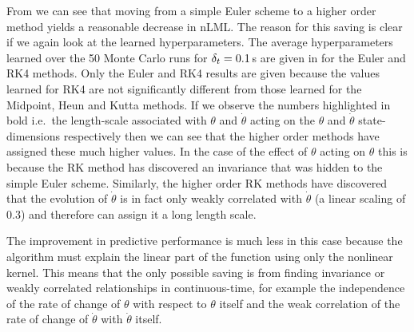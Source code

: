 From  we can see that moving from a simple Euler scheme to a higher order method yields a reasonable decrease in nLML. The reason for this saving is clear if we again look at the learned hyperparameters. The average hyperparameters learned over the 50 Monte Carlo runs for $\delta_t=0.1\,$s are given in  for the Euler and RK4 methods. Only the Euler and RK4 results are given because the values learned for RK4 are not significantly different from those learned for the Midpoint, Heun and Kutta methods. If we observe the numbers highlighted in bold i.e.\ the length-scale associated with $\theta$ and $\dot\theta$ acting on the $\theta$ and $\dot\theta$ state-dimensions respectively then we can see that the higher order methods have assigned these much higher values. In the case of the effect of $\theta$ acting on $\theta$ this is because the RK method has discovered an invariance that was hidden to the simple Euler scheme. Similarly, the higher order RK methods have discovered that the evolution of $\dot\theta$ is in fact only weakly correlated with $\dot\theta$ (a linear scaling of 0.3) and therefore can assign it a long length scale.


The improvement in predictive performance is much less in this case because the algorithm must explain the linear part of the function using only the nonlinear kernel. This means that the only possible saving is from finding invariance or weakly correlated relationships in continuous-time, for example the independence of the rate of change of $\theta$ with respect to $\theta$ itself and the weak correlation of the rate of change of $\dot\theta$ with $\dot\theta$ itself.






